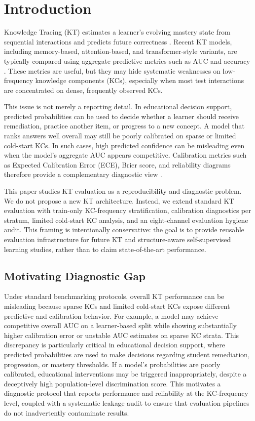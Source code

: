 \section{Introduction}
\label{sec:introduction}
Knowledge Tracing (KT) estimates a learner's evolving mastery state from sequential interactions and predicts future correctness \cite{corbett1994knowledge,piech2015deep,abdelrahman2023knowledge}. Recent KT models, including memory-based, attention-based, and transformer-style variants, are typically compared using aggregate predictive metrics such as AUC and accuracy \cite{zhang2017dynamic,ghosh2020context,liu2023simplekt}. These metrics are useful, but they may hide systematic weaknesses on low-frequency knowledge components (KCs), especially when most test interactions are concentrated on dense, frequently observed KCs.

This issue is not merely a reporting detail. In educational decision support, predicted probabilities can be used to decide whether a learner should receive remediation, practice another item, or progress to a new concept. A model that ranks answers well overall may still be poorly calibrated on sparse or limited cold-start KCs. In such cases, high predicted confidence can be misleading even when the model's aggregate AUC appears competitive. Calibration metrics such as Expected Calibration Error (ECE), Brier score, and reliability diagrams therefore provide a complementary diagnostic view \cite{guo2017calibration,brier1950verification,degroot1983comparison}.

This paper studies KT evaluation as a reproducibility and diagnostic problem. We do not propose a new KT architecture. Instead, we extend standard KT evaluation with train-only KC-frequency stratification, calibration diagnostics per stratum, limited cold-start KC analysis, and an eight-channel evaluation hygiene audit. This framing is intentionally conservative: the goal is to provide reusable evaluation infrastructure for future KT and structure-aware self-supervised learning studies, rather than to claim state-of-the-art performance.

\subsection{Motivating Diagnostic Gap}
Under standard benchmarking protocols, overall KT performance can be misleading because sparse KCs and limited cold-start KCs expose different predictive and calibration behavior. For example, a model may achieve competitive overall AUC on a learner-based split while showing substantially higher calibration error or unstable AUC estimates on sparse KC strata. This discrepancy is particularly critical in educational decision support, where predicted probabilities are used to make decisions regarding student remediation, progression, or mastery thresholds. If a model's probabilities are poorly calibrated, educational interventions may be triggered inappropriately, despite a deceptively high population-level discrimination score. This motivates a diagnostic protocol that reports performance and reliability at the KC-frequency level, coupled with a systematic leakage audit to ensure that evaluation pipelines do not inadvertently contaminate results.

